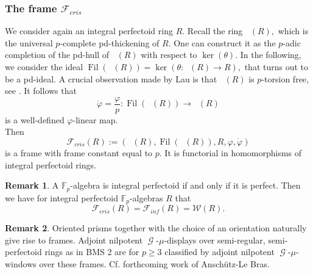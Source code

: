 \documentclass[a4paper,10,5 pt]{amsart}
\theoremstyle{definition}
\newtheorem{Remark}{Remark}
\DeclareMathOperator{\Acris}{\mathbb{A}_{cris}}
\DeclareMathOperator{\Ainf}{\mathbb{A}_{inf}}
\DeclareMathOperator{\Fil}{Fil}
\DeclareMathOperator{\G}{\mathcal{G}}
\begin{document}
\subsubsection{The frame $\mathcal{F}_{cris}$}
We consider again an integral perfectoid ring $R.$ Recall the ring $\Acris(R),$ which is the universal $p$-complete pd-thickening of $R.$ One can construct it as the $p$-adic completion of the pd-hull of $\Ainf(R)$ with respect to $\ker(\theta).$ In the following, we consider the ideal $\Fil(\Acris(R))=\ker(\theta\colon \Acris(R)\rightarrow R),$ that turns out to be a pd-ideal. A crucial observation made by Lau is that $\Acris(R)$ is $p$-torsion free, see \cite[Prop. 8.11.]{Lau perfektoid}. It follows that 
$$\dot{\varphi}=\frac{\varphi}{p}\colon \Fil(\Acris(R)) \rightarrow \Acris(R)$$ is a well-defined $\varphi$-linear map.
\\
Then
$$\mathcal{F}_{cris}(R):=(\Acris(R), \Fil(\Acris(R)),R,\varphi,\dot{\varphi})$$
is a frame with frame constant equal to $p$. It is functorial in homomorphisms of integral perfectoid rings.
\begin{Remark}
A $\mathbb{F}_{p}$-algebra is integral perfectoid if and only if it is perfect. Then we have for integral perfectoid $\mathbb{F}_{p}$-algebras $R$ that $$\mathcal{F}_{cris}(R)=\mathcal{F}_{inf}(R)=\mathcal{W}(R).$$
\end{Remark}
\begin{Remark}
Oriented prisms together with the choice of an orientation naturally give rise to frames. Adjoint nilpotent $\G$-$\mu$-displays over semi-regular, semi-perfectoid rings as in BMS 2 are for $p\geq 3$  classified by adjoint nilpotent $\G$-$\mu$-windows over these frames. Cf. forthcoming work of Anschütz-Le Bras.
\end{Remark}
\end{document}
